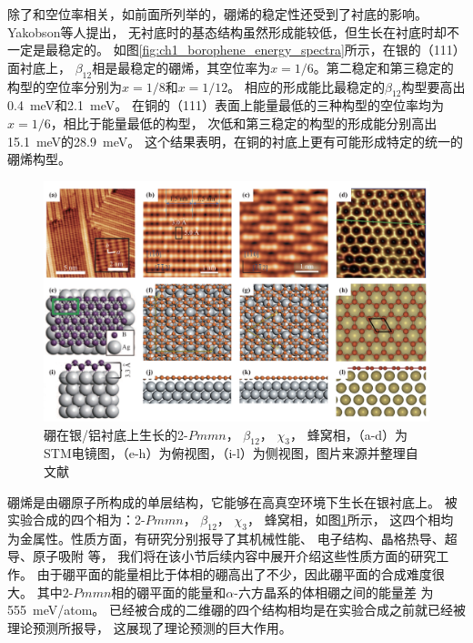 除了和空位率相关，如前面所列举的，硼烯的稳定性还受到了衬底的影响。
Yakobson等人提出\cite{zhang2015two}，
无衬底时的基态结构虽然形成能较低，但生长在衬底时却不一定是最稳定的。
如图\ref{fig:ch1_borophene_energy_spectra}所示，在银的（111）面衬底上，
$\beta_{12}$相是最稳定的硼烯，其空位率为$x=1/6$。第二稳定和第三稳定的构型的空位率分别为$x=1/8$和$x=1/12$。
相应的形成能比最稳定的$\beta_{12}$构型要高出\SI{0.4}{\meV}和\SI{2.1}{\meV}。
在铜的（111）表面上能量最低的三种构型的空位率均为$x=1/6$，相比于能量最低的构型，
次低和第三稳定的构型的形成能分别高出\SI{15.1}{\meV}的\SI{28.9}{\meV}\cite{zhang2015two}。
这个结果表明，在铜的衬底上更有可能形成特定的统一的硼烯构型。

\begin{figure}[htb]
  \includegraphics[width=1.0\textwidth]{figs/ch1_boron4phase.png}
  \centering
  \caption{硼在银/铝衬底上生长的2-$Pmmn$， $\beta_{12}$， $\chi_3$， 蜂窝相，（a-d）为STM电镜图，（e-h）为俯视图，（i-l）为侧视图，图片来源并整理自文献\cite{mannix2015synthesis,li2018experimental,feng2016experimental}}
  \label{fig:boron4phase}
\end{figure}

硼烯是由硼原子所构成的单层结构，它能够在高真空环境下生长在银衬底上\cite{zhang2015two}。
被实验合成的四个相为：2-$Pmmn$， $\beta_{12}$， $\chi_3$， 蜂窝相，如图\ref{fig:boron4phase}所示，
这四个相均为金属性。性质方面，有研究分别报导了其机械性能、
电子结构、晶格热导、超导、原子吸附
等\cite{penev2016can, xu2016nucleation, lopez2016electronic, peng2016electronic, carrete2016physically, wang2016strain, xiao2016enhanced, gao2017prediction, liu2016stable, yang2008ab, zabolotskiy2016strain, yuan2015effect, liu2013boron, zhang2016borophene, shu2016unveiling}，
我们将在该小节后续内容中展开介绍这些性质方面的研究工作。
由于硼平面的能量相比于体相的硼高出了不少，因此硼平面的合成难度很大。
其中2-$Pmmn$相的硼平面的能量和$\alpha$-六方晶系的体相硼之间的能量差
为\SI{555}{\meV/atom}\cite{lherbier2016electronic}。
已经被合成的二维硼的四个结构相均是在实验合成之前就已经被理论预测所报导，
这展现了理论预测的巨大作用。

